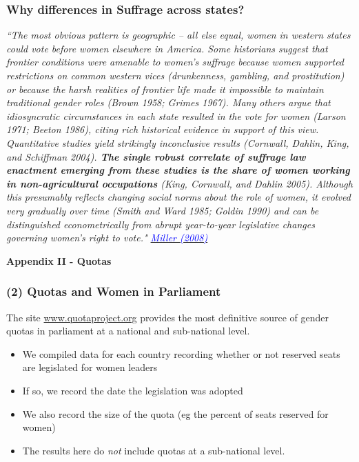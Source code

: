 \documentclass[10pt,letterpaper,subeqn]{beamer}
\begin{document}
\begin{frame}[label=WhySuffrage]
\frametitle{Why differences in Suffrage across states?}
\vspace{4mm}
\textit{``The most obvious pattern is geographic – all else equal, women in western states could vote before women elsewhere in America. Some historians suggest that frontier conditions were amenable to women's suffrage because women supported restrictions on common western vices (drunkenness, gambling, and prostitution) or because the harsh realities of frontier life made it impossible to maintain traditional gender roles (Brown 1958; Grimes 1967). Many others argue that idiosyncratic circumstances in each state resulted in the vote for women (Larson 1971; Beeton 1986), citing rich historical evidence in support of this view. Quantitative studies yield strikingly inconclusive results (Cornwall, Dahlin, King, and Schiffman 2004). \textbf{The single robust correlate of suffrage law enactment emerging from these studies is the share of women working in non-agricultural occupations} (King, Cornwall, and Dahlin 2005). Although this presumably reflects changing social norms about the role of women, it evolved very gradually over time (Smith and Ward 1985; Goldin 1990) and can be distinguished econometrically from abrupt year-to-year legislative changes governing women’s right to vote." \hyperlink{USAHistory}{\textcolor{blue}{Miller (2008)}}}\\
 \end{frame} 


\begin{frame}[plain]
\begin{center}
\textbf{Appendix II - Quotas}
\end{center}
\end{frame}
\begin{frame}
\frametitle{(2) Quotas and Women in Parliament}
The site \url{www.quotaproject.org} provides the most definitive source of
gender quotas in parliament at a national and sub-national level. \vspace{5mm}
\begin{itemize}
\setlength{\itemsep}{10pt}
\item We compiled data for each country recording whether or
  not reserved seats are legislated for women leaders
\item If so, we record the date the legislation was adopted
\item We also record the size of the quota (eg the percent of seats reserved for
  women)
\item The results here do \emph{not} include quotas at a sub-national level.
\end{itemize}
\end{frame}
\end{document}

